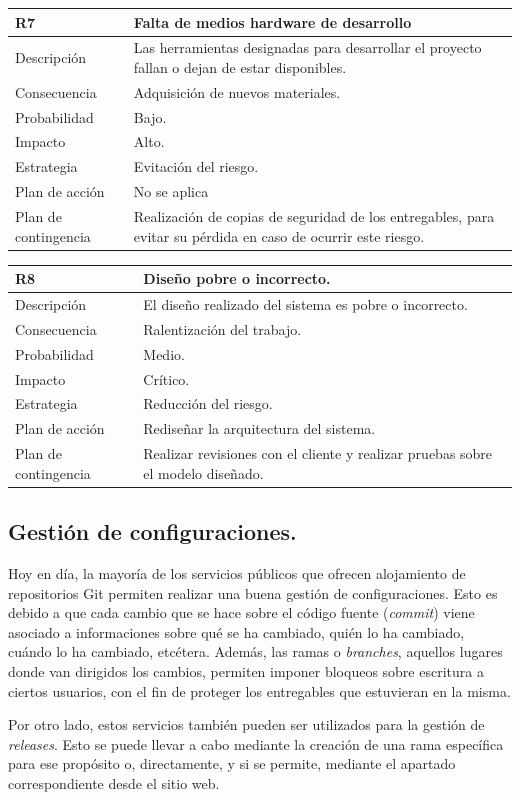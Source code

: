 \documentclass[twoside]{report}
\newcommand\addrow[2]{#1 &#2\\ }
\newcommand\addheading[2]{#1 &#2\\ \hline}
\newcommand\tabularhead{\begin{tabular}{lp{0.7\textwidth}}
\hline
}
\newenvironment{risk}{\tabularhead}
{\hline\end{tabular}}
\begin{document}
\vspace{0.5cm}

\begin{risk}
  \addheading{R7}{Falta de medios hardware de desarrollo}
  \addrow{Descripción}{Las herramientas designadas para desarrollar el proyecto fallan o dejan de estar disponibles.}
  \addrow{Consecuencia}{Adquisición de nuevos materiales.}
  \addrow{Probabilidad}{Bajo.}
  \addrow{Impacto}{Alto. }
  \addrow{Estrategia}{Evitación del riesgo.}
  \addrow{Plan de acción}{No se aplica}
  \addrow{Plan de contingencia}{Realización de copias de seguridad de los entregables, para evitar su pérdida en caso de ocurrir este riesgo.}
\end{risk}

\vspace{0.5cm}

\begin{risk}
  \addheading{R8}{Diseño pobre o incorrecto.} 
  \addrow{Descripción}{El diseño realizado del sistema es pobre o incorrecto.}
  \addrow{Consecuencia}{Ralentización del trabajo.}
  \addrow{Probabilidad}{Medio.}
  \addrow{Impacto}{Crítico. }
  \addrow{Estrategia}{Reducción del riesgo.}
  \addrow{Plan de acción}{Rediseñar la arquitectura del sistema.}
  \addrow{Plan de contingencia}{Realizar revisiones con el cliente y realizar pruebas sobre el modelo diseñado.}
\end{risk}

\subsection{Gestión de configuraciones.}

Hoy en día, la mayoría de los servicios públicos que ofrecen alojamiento de repositorios Git permiten realizar una buena gestión de configuraciones. Esto es debido a que cada cambio que se hace sobre el código fuente (\textit{commit}) viene asociado a informaciones sobre qué se ha cambiado, quién lo ha cambiado, cuándo lo ha cambiado, etcétera. Además, las ramas o \textit{branches}, aquellos lugares donde van dirigidos los cambios, permiten imponer bloqueos sobre escritura a ciertos usuarios, con el fin de proteger los entregables que estuvieran en la misma.

Por otro lado, estos servicios también pueden ser utilizados para la gestión de \textit{releases}. Esto se puede llevar a cabo mediante la creación de una rama específica para ese propósito o, directamente, y si se permite, mediante el apartado correspondiente desde el sitio web.
\end{document}

